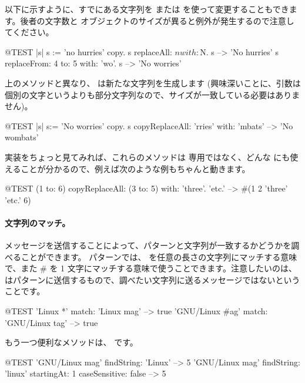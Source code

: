 \documentclass[a4paper,10pt,twoside]{book}
\begin{document}
以下に示すように、すでにある文字列を  または  を使って変更することもできます。後者の文字数と  オブジェクトのサイズが異ると例外が発生するので注意してください。

\begin{code}{@TEST |s| s := 'no hurries' copy.}
s replaceAll: $n with: $N.
s --> 'No hurries'
s replaceFrom: 4 to: 5 with: 'wo'.
s --> 'No worries'
\end{code}

上のメソッドと異なり、 は新たな文字列を生成します
(興味深いことに、引数は個別の文字というよりも部分文字列なので、サイズが一致している必要はありません)。

\begin{code}{@TEST |s| s:= 'No worries' copy.}
s copyReplaceAll: 'rries' with: 'mbats' --> 'No wombats'
\end{code}

実装をちょっと見てみれば、これらのメソッドは  専用ではなく、どんな  にも使えることが分かるので、例えば次のような例もちゃんと動きます。

\begin{code}{@TEST}
(1 to: 6) copyReplaceAll: (3 to: 5) with: { 'three'. 'etc.' } --> #(1 2 'three' 'etc.' 6)
\end{code}

\paragraph{文字列のマッチ。}
 メッセージを送信することによって、パターンと文字列が一致するかどうかを調べることができます。
パターンでは、\ct{*} を任意の長さの文字列にマッチする意味で、また \# を 1 文字にマッチする意味で使うことできます。注意したいのは、 はパターンに送信するもので、調べたい文字列に送るメッセージではないということです。
\begin{code}{@TEST}
'Linux *' match: 'Linux mag'                      --> true
'GNU/Linux #ag' match: 'GNU/Linux tag' --> true
\end{code}

もう一つ便利なメソッドは、 です。
\begin{code}{@TEST}
'GNU/Linux mag' findString: 'Linux'                                                      --> 5
'GNU/Linux mag' findString: 'linux' startingAt: 1 caseSensitive: false  --> 5
\end{code}
\end{document}
